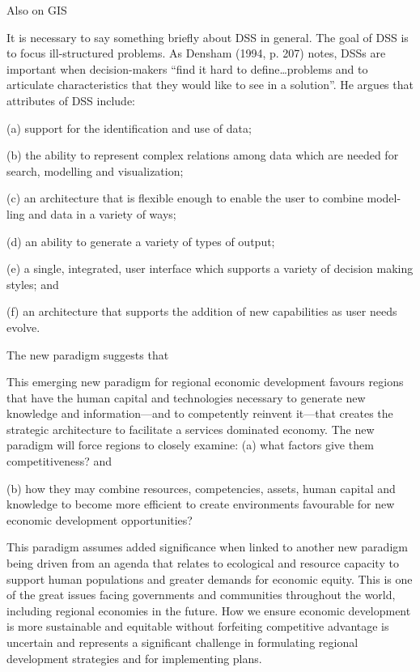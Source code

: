 Also on GIS

It is necessary to say something briefly about DSS in general. The goal of DSS is to focus ill-structured problems. As Densham (1994, p. 207) notes, DSSs are important when decision-makers “find it hard to define…problems and to articulate characteristics that they would like to see in a solution”. He argues that attributes of DSS include:\par
(a) support for the identification and use of data;\par
(b) the ability to represent complex relations among data which are needed for search, modelling and visualization;\par
(c) an architecture that is flexible enough to enable the user to combine model- ling and data in a variety of ways;\par
(d) an ability to generate a variety of types of output;\par
(e) a single, integrated, user interface which supports a variety of decision making styles; and\par
(f) an architecture that supports the addition of new capabilities as user needs evolve.




The new paradigm suggests that

This emerging new paradigm for regional economic development favours regions that have the human capital and technologies necessary to generate new knowledge and information—and to competently reinvent it—that creates the strategic architecture to facilitate a services dominated economy. The new paradigm will force regions to closely examine:
(a) what factors give them competitiveness? and \par
(b) how they may combine resources, competencies, assets, human capital and knowledge to become more efficient to create environments favourable for new economic development opportunities?\par
This paradigm assumes added significance when linked to another new paradigm being driven from an agenda that relates to ecological and resource capacity to support human populations and greater demands for economic equity. This is one of the great issues facing governments and communities throughout the world, including regional economies in the future. How we ensure economic development is more sustainable and equitable without forfeiting competitive advantage is uncertain and represents a significant challenge in formulating regional development strategies and for implementing plans.\par

